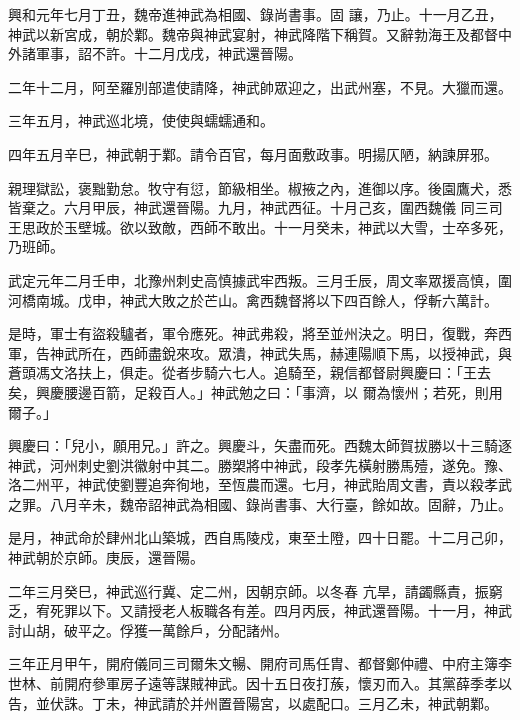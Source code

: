 \begin{pinyinscope}
 興和元年七月丁丑，魏帝進神武為相國、錄尚書事。固
 讓，乃止。十一月乙丑，神武以新宮成，朝於鄴。魏帝與神武宴射，神武降階下稱賀。又辭勃海王及都督中外諸軍事，詔不許。十二月戊戌，神武還晉陽。



 二年十二月，阿至羅別部遣使請降，神武帥眾迎之，出武州塞，不見。大獵而還。



 三年五月，神武巡北境，使使與蠕蠕通和。



 四年五月辛巳，神武朝于鄴。請令百官，每月面敷政事。明揚仄陋，納諫屏邪。



 親理獄訟，褒黜勤怠。牧守有愆，節級相坐。椒掖之內，進御以序。後園鷹犬，悉皆棄之。六月甲辰，神武還晉陽。九月，神武西征。十月己亥，圍西魏儀
 同三司王思政於玉壁城。欲以致敵，西師不敢出。十一月癸未，神武以大雪，士卒多死，乃班師。



 武定元年二月壬申，北豫州刺史高慎據武牢西叛。三月壬辰，周文率眾援高慎，圍河橋南城。戊申，神武大敗之於芒山。禽西魏督將以下四百餘人，俘斬六萬計。



 是時，軍士有盜殺驢者，軍令應死。神武弗殺，將至並州決之。明日，復戰，奔西軍，告神武所在，西師盡銳來攻。眾潰，神武失馬，赫連陽順下馬，以授神武，與蒼頭馮文洛扶上，俱走。從者步騎六七人。追騎至，親信都督尉興慶曰：「王去矣，興慶腰邊百箭，足殺百人。」神武勉之曰：「事濟，以
 爾為懷州；若死，則用爾子。」



 興慶曰：「兒小，願用兄。」許之。興慶斗，矢盡而死。西魏太師賀拔勝以十三騎逐神武，河州刺史劉洪徽射中其二。勝槊將中神武，段孝先橫射勝馬殪，遂免。豫、洛二州平，神武使劉豐追奔徇地，至恆農而還。七月，神武貽周文書，責以殺孝武之罪。八月辛未，魏帝詔神武為相國、錄尚書事、大行臺，餘如故。固辭，乃止。



 是月，神武命於肆州北山築城，西自馬陵戍，東至土隥，四十日罷。十二月己卯，神武朝於京師。庚辰，還晉陽。



 二年三月癸巳，神武巡行冀、定二州，因朝京師。以冬春
 亢旱，請蠲縣責，振窮乏，宥死罪以下。又請授老人板職各有差。四月丙辰，神武還晉陽。十一月，神武討山胡，破平之。俘獲一萬餘戶，分配諸州。



 三年正月甲午，開府儀同三司爾朱文暢、開府司馬任胄、都督鄭仲禮、中府主簿李世林、前開府參軍房子遠等謀賊神武。因十五日夜打蔟，懷刃而入。其黨薛季孝以告，並伏誅。丁未，神武請於并州置晉陽宮，以處配口。三月乙未，神武朝鄴。




\end{pinyinscope}
